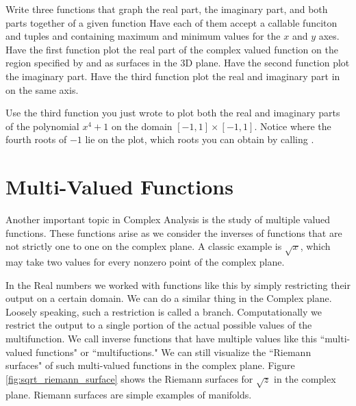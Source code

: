 \begin{problem}
Write three functions that graph the real part, the imaginary part, and both parts together of a given function 
Have each of them accept a callable funciton  and tuples  and  containing maximum and minimum values for the $x$ and $y$ axes.
Have the first function plot the real part of the complex valued function  on the region specified by  and  as surfaces in the 3D plane.
Have the second function plot the imaginary part.
Have the third function plot the real and imaginary part in on the same axis.

Use the third function you just wrote to plot both the real and imaginary parts of the polynomial $x^4 + 1$ on the domain $\left[-1, 1\right] \times \left[-1, 1\right]$.
Notice where the fourth roots of $-1$ lie on the plot, which roots you can obtain by calling .
\end{problem}

\section*{Multi-Valued Functions}

Another important topic in Complex Analysis is the study of multiple valued functions.
These functions arise as we consider the inverses of functions that are not strictly one to one on the complex plane.
A classic example is $\sqrt{x}$, which may take two values for every nonzero point of the complex plane.

In the Real numbers we worked with functions like this by simply restricting their output on a certain domain.
We can do a similar thing in the Complex plane.
Loosely speaking, such a restriction is called a branch.
Computationally we restrict the output to a single portion of the actual possible values of the multifunction.
We call inverse functions that have multiple values like this ``multi-valued functions" or ``multifuctions."
We can still visualize the ``Riemann surfaces" of such multi-valued functions in the complex plane.
Figure \ref{fig:sqrt_riemann_surface} shows the Riemann surfaces for $\sqrt{z}$ in the complex plane.
Riemann surfaces are simple examples of manifolds.

